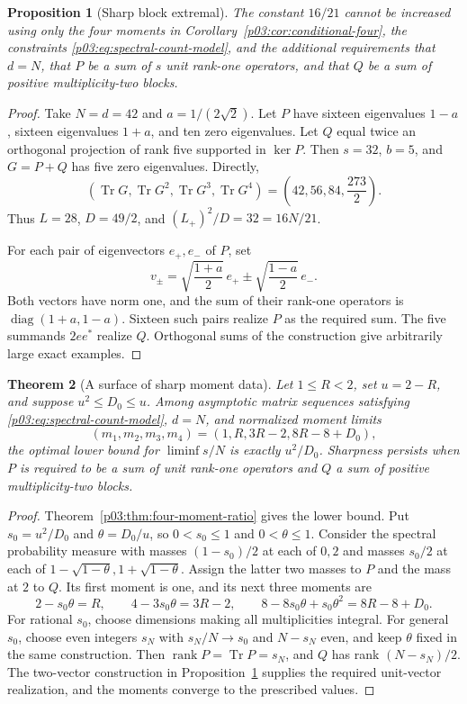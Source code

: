 \documentclass[11pt,letterpaper]{article}
\newtheorem{theorem}{Theorem}[section]
\newtheorem{proposition}[theorem]{Proposition}
\theoremstyle{definition}
\theoremstyle{remark}
\newcommand{\1}{\mathbf 1}
\begin{document}
\begin{proposition}[Sharp block extremal]\label{p03:prop:four-moment-sharp}
The constant $16/21$ cannot be increased using only the four moments in Corollary~\ref{p03:cor:conditional-four}, the constraints \eqref{p03:eq:spectral-count-model}, and the additional requirements that $d=N$, that $P$ be a sum of $s$ unit rank-one operators, and that $Q$ be a sum of positive multiplicity-two blocks.
\end{proposition}
\begin{proof}
Take $N=d=42$ and $a=1/(2\sqrt2)$. Let $P$ have sixteen eigenvalues $1-a$, sixteen eigenvalues $1+a$, and ten zero eigenvalues. Let $Q$ equal twice an orthogonal projection of rank five supported in $\ker P$. Then $s=32$, $b=5$, and $G=P+Q$ has five zero eigenvalues. Directly,
\[
 (\operatorname{Tr}G,\operatorname{Tr}G^2,
 \operatorname{Tr}G^3,\operatorname{Tr}G^4)
 =\left(42,56,84,\frac{273}{2}\right).
\]
Thus $L=28$, $D=49/2$, and $(L_+)^2/D=32=16N/21$.

For each pair of eigenvectors $e_+,e_-$ of $P$, set
\[
 v_\pm=\sqrt{\frac{1+a}{2}}\,e_+
       \mathbin{\pm}\sqrt{\frac{1-a}{2}}\,e_-.
\]
Both vectors have norm one, and the sum of their rank-one operators is $\operatorname{diag}(1+a,1-a)$. Sixteen such pairs realize $P$ as the required sum. The five summands $2ee^*$ realize $Q$. Orthogonal sums of the construction give arbitrarily large exact examples.
\end{proof}

\begin{theorem}[A surface of sharp moment data]\label{p03:thm:sharp-moment-surface}
Let $1\le R<2$, set $u=2-R$, and suppose $u^2\le D_0\le u$. Among asymptotic matrix sequences satisfying \eqref{p03:eq:spectral-count-model}, $d=N$, and normalized moment limits
\[
 (m_1,m_2,m_3,m_4)=(1,R,3R-2,8R-8+D_0),
\]
the optimal lower bound for $\liminf s/N$ is exactly $u^2/D_0$. Sharpness persists when $P$ is required to be a sum of unit rank-one operators and $Q$ a sum of positive multiplicity-two blocks.
\end{theorem}
\begin{proof}
Theorem~\ref{p03:thm:four-moment-ratio} gives the lower bound. Put $s_0=u^2/D_0$ and $\theta=D_0/u$, so $0<s_0\le1$ and $0<\theta\le1$. Consider the spectral probability measure with masses $(1-s_0)/2$ at each of $0,2$ and masses $s_0/2$ at each of $1-\sqrt{1-\theta},1+\sqrt{1-\theta}$. Assign the latter two masses to $P$ and the mass at $2$ to $Q$. Its first moment is one, and its next three moments are
\[
 2-s_0\theta=R,\qquad
 4-3s_0\theta=3R-2,\qquad
 8-8s_0\theta+s_0\theta^2=8R-8+D_0.
\]
For rational $s_0$, choose dimensions making all multiplicities integral. For general $s_0$, choose even integers $s_N$ with $s_N/N\to s_0$ and $N-s_N$ even, and keep $\theta$ fixed in the same construction. Then $\operatorname{rank}P=\operatorname{Tr}P=s_N$, and $Q$ has rank $(N-s_N)/2$. The two-vector construction in Proposition~\ref{p03:prop:four-moment-sharp} supplies the required unit-vector realization, and the moments converge to the prescribed values.
\end{proof}
\end{document}
